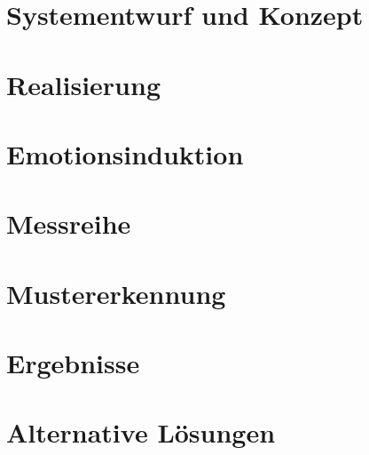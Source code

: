 

\section{Systementwurf und Konzept} \label{systementwurf-4}



\newpage
\section{Realisierung} \label{realisierung-4}



\newpage
\section{Emotionsinduktion} \label{emotionsinduktion-4}



\newpage
\section{Messreihe} \label{messreihe-4}



\newpage
\section{Mustererkennung} \label{mustererkennung-4}


\newpage
\section{Ergebnisse} \label{ergenisse-4}


\newpage
\section{Alternative Lösungen} \label{alternativen-4}


